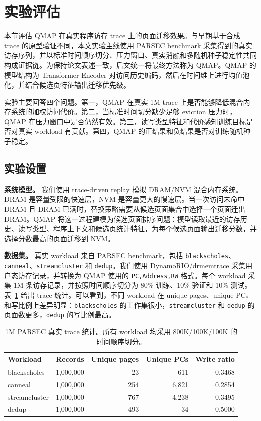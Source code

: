 \section{实验评估}
\label{sec:evaluation}

本节评估 QMAP 在真实程序访存 trace 上的页面迁移效果。与早期基于合成 trace 的原型验证不同，本文实验主线使用 PARSEC benchmark 采集得到的真实访存序列，并以标准时间顺序切分、压力窗口、真实消融和多随机种子稳定性共同构成证据链。为保持论文表述一致，后文统一将最终方法称为 QMAP。QMAP 的模型结构为 Transformer Encoder 对访问历史编码，然后在时间维上进行均值池化，并结合候选页特征输出迁移优先级。

实验主要回答四个问题。第一，QMAP 在真实 1M trace 上是否能够降低混合内存系统的加权访问代价。第二，当标准时间切分缺少足够 eviction 压力时，QMAP 在压力窗口中是否仍然有效。第三，读写类型特征和代价感知训练目标是否对真实 workload 有贡献。第四，QMAP 的正结果和负结果是否对训练随机种子稳定。

\subsection{实验设置}

\textbf{系统模型。}
我们使用 trace-driven replay 模拟 DRAM/NVM 混合内存系统。DRAM 是容量受限的快速层，NVM 是容量更大的慢速层。当一次访问未命中 DRAM 且 DRAM 已满时，替换策略需要从候选页面集合中选择一个页面迁出 DRAM。QMAP 将这一过程建模为候选页面排序问题：模型读取最近的访存历史、读写类型、程序上下文和候选页统计特征，为每个候选页面输出迁移分数，并选择分数最高的页面迁移到 NVM。

\textbf{数据集。}
真实 workload 来自 PARSEC benchmark，包括 \texttt{blackscholes}、\texttt{canneal}、\texttt{streamcluster} 和 \texttt{dedup}。我们使用 DynamoRIO/drmemtrace 采集用户态访存记录，并转换为 QMAP 使用的 \texttt{PC,Address,RW} 格式。每个 workload 采集 1M 条访存记录，并按照时间顺序切分为 80\% 训练、10\% 验证和 10\% 测试。表~\ref{tab:real-trace-stats} 给出 trace 统计。可以看到，不同 workload 在 unique pages、unique PCs 和写比例上差异明显：\texttt{blackscholes} 的工作集很小，\texttt{streamcluster} 和 \texttt{dedup} 的页面数更多，\texttt{dedup} 的写比例最高。

\begin{table}[t]
  \centering
  \caption{1M PARSEC 真实 trace 统计。所有 workload 均采用 800K/100K/100K 的时间顺序切分。}
  \label{tab:real-trace-stats}
  \scriptsize
  \begin{tabular}{lrrrr}
    \toprule
    Workload & Records & Unique pages & Unique PCs & Write ratio \\
    \midrule
    blackscholes & 1,000,000 & 23 & 611 & 0.3468 \\
    canneal & 1,000,000 & 254 & 6,821 & 0.2854 \\
    streamcluster & 1,000,000 & 767 & 4,238 & 0.3495 \\
    dedup & 1,000,000 & 493 & 34 & 0.5000 \\
    \bottomrule
  \end{tabular}
\end{table}

